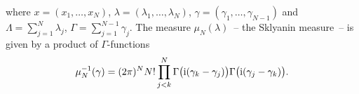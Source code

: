where $x=(x_1,\dots,x_N)$, $\lambda = (\lambda_1,\dots,\lambda_N )$, $\gamma = (\gamma_1,\dots,\gamma_{N-1})$ and
$\Lambda = \sum^N_{j=1}\lambda_j$, $\Gamma = \sum^{N-1}_{j=1}\gamma_j$. The measure $\mu_N(\lambda)$~-- the Sklyanin measure~-- is given
by a product of $\Gamma$-functions
\begin{gather*}
\mu_N^{-1}(\gamma) =(2\pi)^N {N!}\prod^N_{j < k}\Gamma\big({\rm i}(\gamma_k-\gamma_j)\big)
\Gamma\big({\rm i}(\gamma_j-\gamma_k)\big).
\end{gather*}
